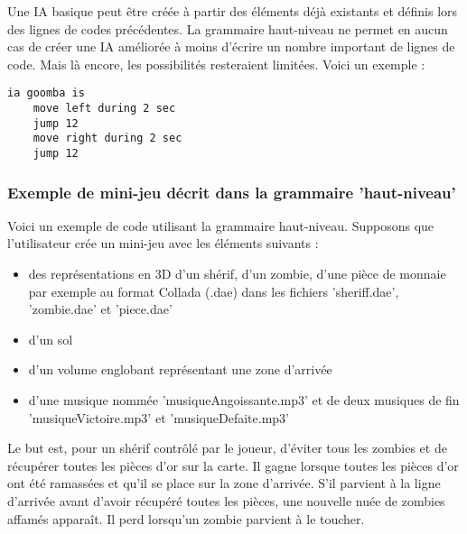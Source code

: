 Une IA basique peut être créée à partir des éléments déjà existants et définis lors des lignes de codes précédentes. 
La grammaire haut-niveau ne permet en aucun cas de créer une IA améliorée à moins d'écrire un nombre important de lignes de code. 
Mais là encore, les possibilités resteraient limitées. Voici un exemple : 
\begin{lstlisting}[language=GameGrammar]
ia goomba is 
	move left during 2 sec
	jump 12
	move right during 2 sec
	jump 12
\end{lstlisting}

\subsubsection{Exemple de mini-jeu décrit dans la grammaire 'haut-niveau'}

Voici un exemple de code utilisant la grammaire haut-niveau.
Supposons que l'utilisateur crée un mini-jeu avec les éléments suivants :
\begin{itemize}
\item des représentations en 3D d'un shérif, d'un zombie, d'une pièce de monnaie 
par exemple au format Collada (.dae) dans les fichiers 'sheriff.dae', 'zombie.dae' et 'piece.dae'
\item d'un sol 
\item d'un volume englobant représentant une zone d'arrivée
\item d'une musique nommée 'musiqueAngoissante.mp3' et de deux musiques de fin 'musiqueVictoire.mp3' et 'musiqueDefaite.mp3'
\end{itemize}

Le but est, pour un shérif contrôlé par le joueur, d'éviter tous les zombies et de récupérer toutes les pièces d'or 
sur la carte. 
Il gagne lorsque toutes les pièces d'or ont été ramassées et qu'il se place sur la zone d'arrivée.
S'il parvient à la ligne d'arrivée avant d'avoir récupéré toutes les pièces, une nouvelle nuée de zombies affamés apparaît.
Il perd lorsqu'un zombie parvient à le toucher.

